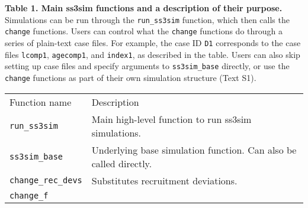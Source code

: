 \documentclass[10pt]{article}
\begin{document}
\textbf{Table 1. Main ss3sim functions and a description of their purpose.}
Simulations can be run through the \texttt{run\_ss3sim} function, which then
calls the \texttt{change} functions. Users can control what the \texttt{change}
functions do through a series of plain-text case files. For example, the case
ID \texttt{D1} corresponds to the case files \texttt{lcomp1},
\texttt{agecomp1}, and \texttt{index1}, as described in the table. Users can
also skip setting up case files and specify arguments to \texttt{ss3sim\_base}
directly, or use the \texttt{change} functions as part of their own simulation
structure (Text S1).

\begin{longtable}[c]{@{}ll@{}}
\hline\noalign{\medskip}
\begin{minipage}[b]{0.32\columnwidth}\raggedright
Function name
\end{minipage} & \begin{minipage}[b]{0.57\columnwidth}\raggedright
Description
\end{minipage}
\\\noalign{\medskip}
\hline\noalign{\medskip}
\begin{minipage}[t]{0.32\columnwidth}\raggedright
\texttt{run\_ss3sim}
\end{minipage} & \begin{minipage}[t]{0.57\columnwidth}\raggedright
Main high-level function to run ss3sim simulations.
\end{minipage}
\\\noalign{\medskip}
\begin{minipage}[t]{0.32\columnwidth}\raggedright
\texttt{ss3sim\_base}
\end{minipage} & \begin{minipage}[t]{0.57\columnwidth}\raggedright
Underlying base simulation function. Can also be called directly.
\end{minipage}
\\\noalign{\medskip}
\begin{minipage}[t]{0.32\columnwidth}\raggedright
\texttt{change\_rec\_devs}
\end{minipage} & \begin{minipage}[t]{0.57\columnwidth}\raggedright
Substitutes recruitment deviations.
\end{minipage}
\\\noalign{\medskip}
\begin{minipage}[t]{0.32\columnwidth}\raggedright
\texttt{change\_f}
\end{minipage} & \begin{minipage}[t]{0.57\columnwidth}\raggedright

\end{minipage}
\end{longtable}
\end{document}
